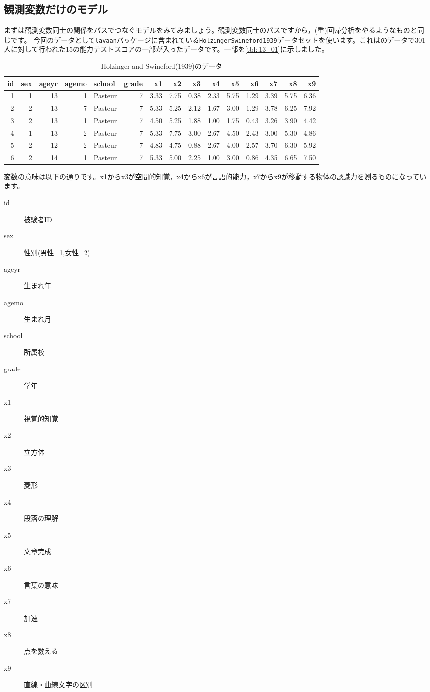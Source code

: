 \documentclass{ltjsbook}
\begin{document}
\subsection{観測変数だけのモデル}
まずは観測変数同士の関係をパスでつなぐモデルをみてみましょう。観測変数同士のパスですから，(重)回帰分析をやるようなものと同じです。
今回のデータとして\texttt{lavaan}パッケージに含まれている\texttt{HolzingerSwineford1939}データセットを使います。これは\citep{holzinger1939study}のデータで301人に対して行われた15の能力テストスコアの一部が入ったデータです。一部を\ref{tbl::13_01}に示しました。
\begin{table}

    \caption{Holzinger and Swineford(1939)のデータ}
    \centering
    \begin{tabular}[t]{rrrrlrrrrrrrrrr}
    \hline
    id & sex & ageyr & agemo & school & grade & x1 & x2 & x3 & x4 & x5 & x6 & x7 & x8 & x9\\
    \hline
    1 & 1 & 13 & 1 & Pasteur & 7 & 3.33 & 7.75 & 0.38 & 2.33 & 5.75 & 1.29 & 3.39 & 5.75 & 6.36\\
    2 & 2 & 13 & 7 & Pasteur & 7 & 5.33 & 5.25 & 2.12 & 1.67 & 3.00 & 1.29 & 3.78 & 6.25 & 7.92\\
    3 & 2 & 13 & 1 & Pasteur & 7 & 4.50 & 5.25 & 1.88 & 1.00 & 1.75 & 0.43 & 3.26 & 3.90 & 4.42\\
    4 & 1 & 13 & 2 & Pasteur & 7 & 5.33 & 7.75 & 3.00 & 2.67 & 4.50 & 2.43 & 3.00 & 5.30 & 4.86\\
    5 & 2 & 12 & 2 & Pasteur & 7 & 4.83 & 4.75 & 0.88 & 2.67 & 4.00 & 2.57 & 3.70 & 6.30 & 5.92\\
    6 & 2 & 14 & 1 & Pasteur & 7 & 5.33 & 5.00 & 2.25 & 1.00 & 3.00 & 0.86 & 4.35 & 6.65 & 7.50\\
    \hline
    \end{tabular}
    \label{tab:tbl::13_01}
\end{table}
変数の意味は以下の通りです。x1からx3が空間的知覚，x4からx6が言語的能力，x7からx9が移動する物体の認識力を測るものになっています。
\begin{description}
    \item[id] 被験者ID
    \item[sex] 性別(男性=1,女性=2)
    \item[ageyr] 生まれ年
    \item[agemo] 生まれ月
    \item[school] 所属校
    \item[grade] 学年
    \item[x1] 視覚的知覚
    \item[x2] 立方体
    \item[x3] 菱形
    \item[x4] 段落の理解
    \item[x5] 文章完成
    \item[x6] 言葉の意味
    \item[x7] 加速
    \item[x8] 点を数える
    \item[x9] 直線・曲線文字の区別
\end{description} 
\end{document}

